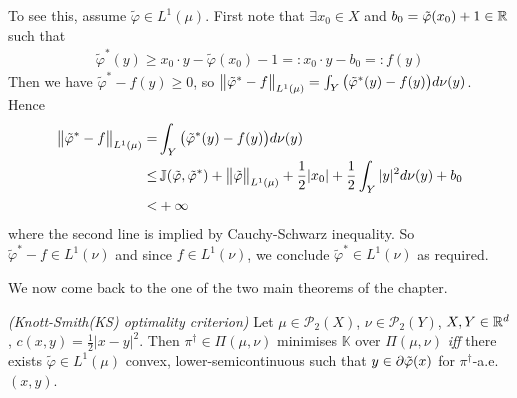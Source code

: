 \documentclass[12pt,a4paper]{article}
\renewenvironment{i}
{\begin{itemize} 
	}%
	{\end{itemize}
}
\begin{document}
\begin{i}
To see this, assume $\tilde{\varphi}\in L^1(\mu)$. First note that $\exists x_0 \in X$ and $b_0 = \tilde{\varphi}(x_0) +1 \in \mathbb{R}$ such that
\begin{align*}
\tilde{\varphi}^*(y) \geq x_0 \cdot y - \tilde{\varphi}(x_0) -1 =: x_0 \cdot y - b_0 =: f(y)
\end{align*} 
Then we have $\tilde{\varphi}^* - f(y) \geq 0$, so $\bigl\lVert\tilde{\varphi}^* - f\bigr\rVert_{L^1(\mu)} = \int_Y \big( \tilde{\varphi}^*(y) - f(y) \big) d\nu(y)$. Hence
\begin{align*}
\bigl\lVert\tilde{\varphi}^* - f\bigr\rVert_{L^1(\mu)} =& \int_Y \big( \tilde{\varphi}^*(y) - f(y) \big) d\nu(y) \\
\leq & \, \mathbb{J} (\tilde{\varphi}, \tilde{\varphi}^*) + \bigl\lVert\tilde{\varphi}\bigr\rVert_{L^1(\mu)} + \frac{1}{2} |x_0| + \frac{1}{2} \int_Y |y|^2 d\nu(y) + b_0 \\
<&  +\infty
\end{align*}
where the second line is implied by Cauchy-Schwarz inequality. So $\tilde{\varphi}^* - f\in L^1(\nu)$ and since $f\in L^1(\nu)$, we conclude $\tilde{\varphi}^* \in L^1(\nu)$ as required.

\end{i}
\s

We now come back to the one of the two main theorems of the chapter.
\s

 \emph{(Knott-Smith(KS) optimality criterion)} Let $\mu \in \mathscr{P}_2(X)$, $\nu \in \mathscr{P}_2(Y)$, $X, Y\in \mathbb{R}^d$, $c(x,y) = \frac{1}{2} |x-y|^2$. Then $\pi^{\dagger} \in \Pi(\mu, \nu)$ minimises $\mathbb{K}$ over $\Pi(\mu, \nu)$ \emph{iff} there exists $\tilde{\varphi} \in L^1(\mu)$ convex, lower-semicontinuous such that $y\in \partial \tilde{\varphi}(x)$ for $\pi^{\dagger}$-a.e. $(x,y)$.
\end{document}
